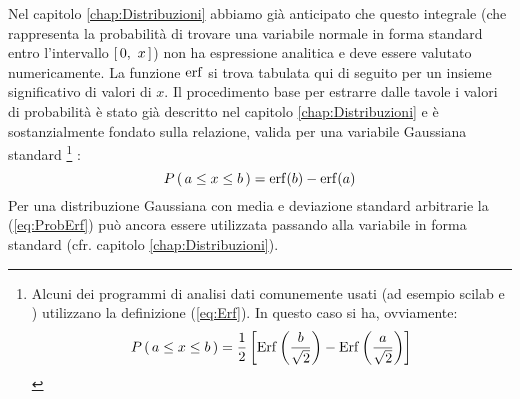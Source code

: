 Nel capitolo \ref{chap:Distribuzioni} abbiamo gi\`a anticipato che questo
integrale (che rappresenta la probabilit\`a di trovare una variabile normale
in forma standard entro l'intervallo $\left[ \, 0, ~ x \, \right]$) non ha espressione
analitica e deve essere valutato numericamente.
La funzione ${\rm erf}$ si trova tabulata qui di seguito per un insieme
significativo di valori di $x$.
Il procedimento base per estrarre dalle tavole i valori di probabilit\`a
\`e stato gi\`a descritto nel capitolo \ref{chap:Distribuzioni} e \`e
sostanzialmente fondato sulla relazione, valida per una variabile Gaussiana
standard%
\footnote{
Alcuni dei programmi di analisi dati comunemente usati (ad esempio scilab e
\gnuplot) utilizzano la definizione (\ref{eq:Erf}).
In questo caso si ha, ovviamente:
$$
\displaystyle P\left(\, a \leq x \leq b \, \right) =
\frac{1}{2} \left[ {\rm Erf}\left(\frac{b}{\sqrt{2}}\right) -
{\rm Erf}\left(\frac{a}{\sqrt{2}}\right) \right]
$$
}%
:
\begin{equation}\label{eq:ProbErf}
\displaystyle P\left(\, a \leq x \leq b \, \right) = {\rm erf}(b) - {\rm erf}(a)
\end{equation}
Per una distribuzione Gaussiana con media e deviazione standard arbitrarie
la (\ref{eq:ProbErf}) pu\`o ancora essere utilizzata passando alla variabile
in forma standard (cfr. capitolo \ref{chap:Distribuzioni}).
